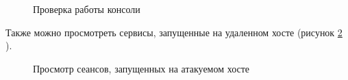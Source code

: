 \documentclass[10pt,a4paper]{report}
\begin{document}
\begin{figure}[h]
\caption{Проверка работы консоли}
\label{ris:img11}  
\end{figure}
 Также можно просмотреть сервисы, запущенные на удаленном хосте (рисунок \ref{ris:img12} ).\\
\begin{figure}[h]
\caption{Просмотр сеансов, запущенных на атакуемом хосте}
\label{ris:img12}   
\end{figure}
\end{document}
